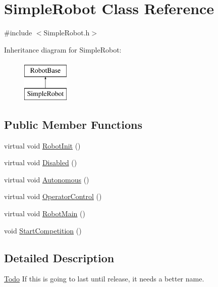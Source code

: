 \hypertarget{classSimpleRobot}{
\section{SimpleRobot Class Reference}
\label{classSimpleRobot}
}


{\ttfamily \#include $<$SimpleRobot.h$>$}

Inheritance diagram for SimpleRobot:\begin{figure}[H]
\begin{center}
\leavevmode
\includegraphics[height=2.000000cm]{classSimpleRobot}
\end{center}
\end{figure}
\subsection*{Public Member Functions}
\begin{DoxyCompactItemize}
\item 
virtual void \hyperlink{classSimpleRobot_a36d930afdef1b1e13a93809e96bbde37}{RobotInit} ()
\item 
virtual void \hyperlink{classSimpleRobot_a93dcecf966462b2c74c879d97c8a7efd}{Disabled} ()
\item 
virtual void \hyperlink{classSimpleRobot_adc17c3196fe3f8250b42a54fb126585e}{Autonomous} ()
\item 
virtual void \hyperlink{classSimpleRobot_ab9bccb38aafefa41352afe10a22ab4a8}{OperatorControl} ()
\item 
virtual void \hyperlink{classSimpleRobot_a19913a6ef4026f8a528eeb18e73d1886}{RobotMain} ()
\item 
void \hyperlink{classSimpleRobot_ae8a0924c156c64ecee70101e1e17e7b2}{StartCompetition} ()
\end{DoxyCompactItemize}


\subsection{Detailed Description}
\begin{Desc}
\item[\hyperlink{todo__todo000004}{Todo}]If this is going to last until release, it needs a better name. \end{Desc}


